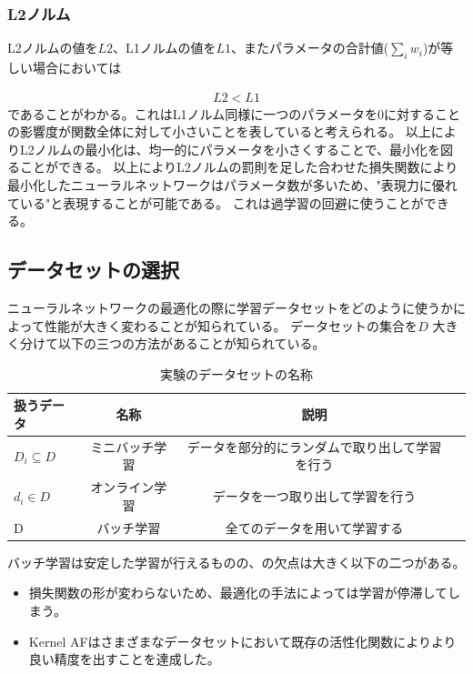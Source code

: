 \subsubsection{L2ノルム}
L2ノルムの値を$ L2 $、L1ノルムの値を$ L1 $、またパラメータの合計値($ \sum_i w_i $)が等しい場合においては

\begin{eqnarray}
L2 < L1
\label{eq:norm uneq}
\end{eqnarray}
であることがわかる。これはL1ノルム同様に一つのパラメータを$ 0 $に対することの影響度が関数全体に対して小さいことを表していると考えられる。
以上によりL2ノルムの最小化は、均一的にパラメータを小さくすることで、最小化を図ることができる。
以上によりL2ノルムの罰則を足した合わせた損失関数により最小化したニューラルネットワークはパラメータ数が多いため、"表現力に優れている"と表現することが可能である。
これは過学習の回避に使うことができる。


\subsection{データセットの選択}
ニューラルネットワークの最適化の際に学習データセットをどのように使うかによって性能が大きく変わることが知られている。
データセットの集合を$ D $ 大きく分けて以下の三つの方法があることが知られている。

\begin{table}[htbp]
    \begin{center}
        \caption{実験のデータセットの名称}
        \vspace{5mm} 
        \begin{tabular}{l*{2}{c}r}
        扱うデータ      & 名称 & 説明 \\
        \hline
        $ D_i \subseteq D $          & ミニバッチ学習  & データを部分的にランダムで取り出して学習を行う \\
        $ d_i \in D $                & オンライン学習 & データを一つ取り出して学習を行う  \\
        D        & バッチ学習 & 全てのデータを用いて学習する \\
        \end{tabular}
    \end{center}
\end{table}

バッチ学習は安定した学習が行えるものの、の欠点は大きく以下の二つがある。

\begin{itemize}
  \item 損失関数の形が変わらないため、最適化の手法によっては学習が停滞してしまう。
  \item Kernel AFはさまざまなデータセットにおいて既存の活性化関数によりより良い精度を出すことを達成した。
\end{itemize}

